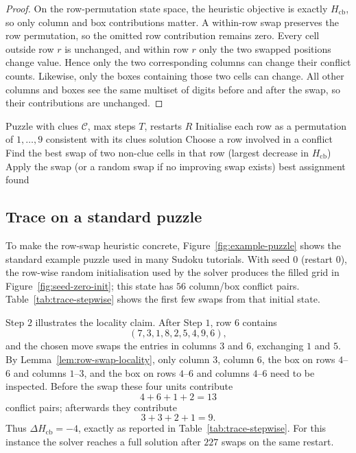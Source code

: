 \documentclass[11pt]{article}
\begin{document}
\begin{proof}
On the row-permutation state space, the heuristic objective is exactly \(H_{\mathrm{cb}}\), so only column and box contributions matter. A within-row swap preserves the row permutation, so the omitted row contribution remains zero. Every cell outside row \(r\) is unchanged, and within row \(r\) only the two swapped positions change value. Hence only the two corresponding columns can change their conflict counts. Likewise, only the boxes containing those two cells can change. All other columns and boxes see the same multiset of digits before and after the swap, so their contributions are unchanged.
\end{proof}

\begin{algorithm}[t]
\caption{Row-swap local search}
\begin{algorithmic}[1]
\Require Puzzle with clues $\mathcal{C}$, max steps $T$, restarts $R$
    \State Initialise each row as a permutation of $1,\dots,9$ consistent with its clues
         \State \Return solution \EndIf
        \State Choose a row involved in a conflict
        \State Find the best swap of two non-clue cells in that row (largest decrease in \(H_{\mathrm{cb}}\))
        \State Apply the swap (or a random swap if no improving swap exists)
    \EndFor
\EndFor
\State \Return best assignment found
\end{algorithmic}
\end{algorithm}

\subsection{Trace on a standard puzzle}
To make the row-swap heuristic concrete, Figure~\ref{fig:example-puzzle} shows the standard example puzzle used in many Sudoku tutorials. With seed \(0\) (restart \(0\)), the row-wise random initialisation used by the solver produces the filled grid in Figure~\ref{fig:seed-zero-init}; this state has \(56\) column/box conflict pairs. Table~\ref{tab:trace-stepwise} shows the first few swaps from that initial state.

Step \(2\) illustrates the locality claim. After Step \(1\), row \(6\) contains
\[
(7,3,1,8,2,5,4,9,6),
\]
and the chosen move swaps the entries in columns \(3\) and \(6\), exchanging \(1\) and \(5\). By Lemma~\ref{lem:row-swap-locality}, only column \(3\), column \(6\), the box on rows \(4\)--\(6\) and columns \(1\)--\(3\), and the box on rows \(4\)--\(6\) and columns \(4\)--\(6\) need to be inspected. Before the swap these four units contribute
\[
4+6+1+2=13
\]
conflict pairs; afterwards they contribute
\[
3+3+2+1=9.
\]
Thus \(\Delta H_{\mathrm{cb}}=-4\), exactly as reported in Table~\ref{tab:trace-stepwise}. For this instance the solver reaches a full solution after \(227\) swaps on the same restart.
\end{document}
